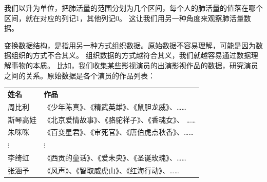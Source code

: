 \documentclass[12pt,UTF8]{ctexbook}
\begin{document}
我们以升为单位，把肺活量的范围分划为几个区间，每个人的肺活量的值落在哪个区间，就在对应的列记$1$，其他列记$0$。
这让我们用另一种角度来观察肺活量数据。

变换数据结构，是指用另一种方式组织数据。原始数据不容易理解，可能是因为数据组织的方式不合其义。
组织数据的方式越符合其义，我们就越容易通过数据理解事物的本质。
比如，我们收集某些影视演员的出演影视作品的数据，研究演员之间的关系。原始数据是各个演员的作品列表：
\begin{center}
    \begin{tabular}{ p{4em}<{\centering} !{\color{white} \vrule width 2pt} p{22em}<{\centering} }
         \textbf{姓名} & \textbf{作品} \\ [0.5ex] 
         周比利 & 《少年陈真》、《精武英雄》、《鼠胆龙威》、…… \\  
         斯琴高娃 & 《北京爱情故事》、《骆驼祥子》、《香魂女》、 …… \\  
         朱咪咪 & 《百变星君》、《审死官》、《唐伯虎点秋香》、…… \\  
         $\vdots$ & $\vdots$ \\  
         李绮虹 & 《西贡的童话》、《爱未央》、《圣诞玫瑰》、…… \\  
         张涵予 & 《风声》、《智取威虎山》、《红海行动》、…… \\  
    \end{tabular}
\end{center}
\end{document}
